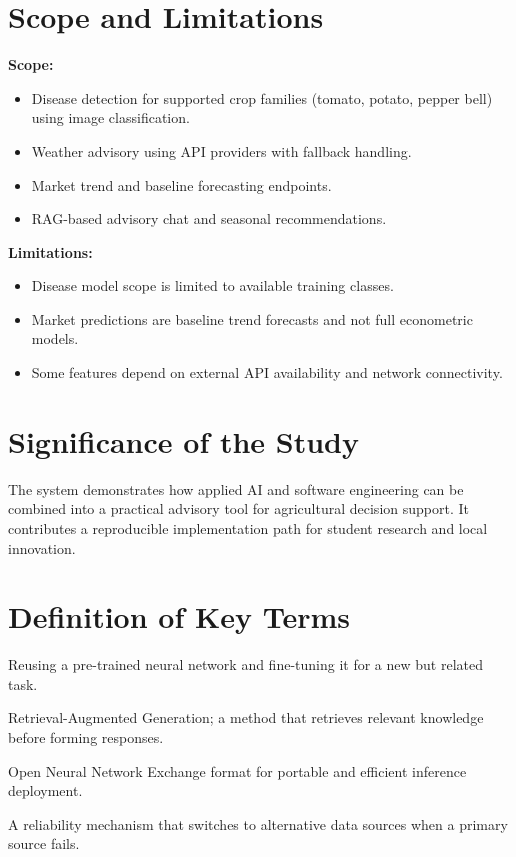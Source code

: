 \documentclass[12pt,a4paper]{report}
\begin{document}
\section{Scope and Limitations}
\textbf{Scope:}
\begin{itemize}[noitemsep]
    \item Disease detection for supported crop families (tomato, potato, pepper bell) using image classification.
    \item Weather advisory using API providers with fallback handling.
    \item Market trend and baseline forecasting endpoints.
    \item RAG-based advisory chat and seasonal recommendations.
\end{itemize}

\textbf{Limitations:}
\begin{itemize}[noitemsep]
    \item Disease model scope is limited to available training classes.
    \item Market predictions are baseline trend forecasts and not full econometric models.
    \item Some features depend on external API availability and network connectivity.
\end{itemize}

\section{Significance of the Study}
The system demonstrates how applied AI and software engineering can be combined into a practical advisory tool for agricultural decision support. It contributes a reproducible implementation path for student research and local innovation.

\section{Definition of Key Terms}
\begin{description}[style=nextline,noitemsep]
    \item[Transfer Learning] Reusing a pre-trained neural network and fine-tuning it for a new but related task.
    \item[RAG] Retrieval-Augmented Generation; a method that retrieves relevant knowledge before forming responses.
    \item[ONNX] Open Neural Network Exchange format for portable and efficient inference deployment.
    \item[Fallback Strategy] A reliability mechanism that switches to alternative data sources when a primary source fails.
\end{description}
\end{document}
